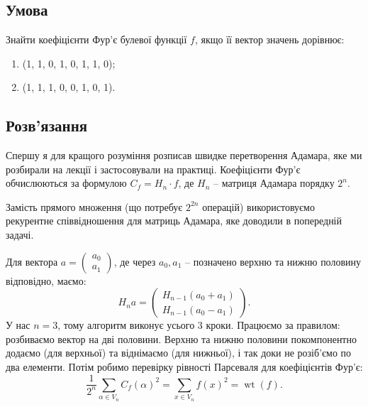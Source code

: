 \chapter{}
\label{chap:3}

\section{Умова}

Знайти коефіцієнти Фур’є булевої функції $f$, якщо її вектор значень дорівнює:
\begin{enumerate}[label=\alph*)]
    \item (1, 1, 0, 1, 0, 1, 1, 0);
    \item (1, 1, 1, 0, 0, 1, 0, 1).
\end{enumerate}

\section{Розв'язання}

\indent Спершу я для кращого розуміння розписав швидке перетворення Адамара, яке ми розбирали на лекції і застосовували на 
практиці. Коефіцієнти Фур'є обчислюються за формулою $C_{f} = H_{n} \cdot f$, де $H_n$ -- матриця Адамара порядку $2^n$.

Замість прямого множення (що потребує $2^{2n}$ операцій) використовуємо рекурентне співвідношення для матриць 
Адамара, яке доводили в попередній задачі.

Для вектора $a = \begin{pmatrix} a_0 \\ a_1 \end{pmatrix}$, де через $a_0, a_1$ -- позначено верхню та нижню половину 
відповідно, маємо:
\begin{equation*}
    H_n a = \begin{pmatrix} H_{n-1}(a_0 + a_1) \\ H_{n-1}(a_0 - a_1) \end{pmatrix}.
\end{equation*}
У нас $n = 3$, тому алгоритм виконує усього $3$ кроки. Працюємо за правилом: розбиваємо вектор на дві половини. 
Верхню та нижню половини покомпонентно додаємо (для верхньої) та віднімаємо (для нижньої), і так доки не розіб'ємо 
по два елементи. Потім робимо перевірку рівності Парсеваля для коефіцієнтів Фур'є:
\begin{equation*}
    \frac{1}{2^n}\sum\limits_{\alpha \in V_n} C_f(\alpha)^2 = \sum\limits_{x \in V_n} f(x)^2 = \operatorname{wt}(f).
\end{equation*}

